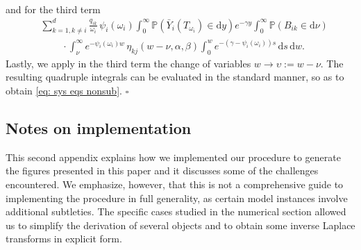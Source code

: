 \documentclass[reqno,12pt]{amsart}
\begin{document}
{\begin{align*}
\end{align*}
and for the third term
\begin{align*}
    &\sum_{k=1,k\neq i}^d \frac{q_{ik}}{\omega_i}\,\psi_i(\omega_i) \int_0^\infty \mathbb{P}\left(\bar{Y}_i(T_{\omega_i})\in\mathrm{d}y\right) e^{-\gamma y} \int_0^\infty \mathbb{P}\left(B_{ik}\in\mathrm{d}\nu\right) \\
    & \:\:\:\:\:\:\:\:\:\:\cdot\int_{\nu}^{\infty} e^{-\psi_i(\omega_i) w}\,\eta_{kj}(w-\nu, \alpha,\beta)\int_0^w e^{-(\gamma-\psi_i(\omega_i))s}\,\mathrm{d}s\,{\mathrm d}w.
\end{align*}
Lastly, we apply in the third term the change of variables $w \to \upsilon:= w-\nu$. The resulting quadruple integrals can be evaluated in the standard manner, so as to obtain \eqref{eq: sys eqs nonsub}. \hfill$\square$



\subsection{Notes on implementation}\label{app: notes on implementation}
This second appendix explains how we implemented our procedure to generate the figures presented in this paper and it discusses some of the challenges encountered. We emphasize, however, that this is not a comprehensive guide to implementing the procedure in full generality, as certain model instances involve additional subtleties. The specific cases studied in the numerical section allowed us to simplify the derivation of several objects and to obtain some inverse Laplace transforms in explicit form.


\medskip

}
\end{document}

